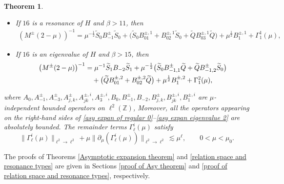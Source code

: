 \documentclass[reqno, 11pt]{amsart}
\newtheorem{theorem}[definition]{Theorem}
\newcommand\Z{\mathbb{Z}}
\numberwithin{equation}{section}
\begin{document}
\begin{theorem}
\begin{itemize}
\begin{align}\label{asy expan regular 2}
\left(M^{\pm}(2-\mu)\right)^{-1}=\widetilde{Q}B_{0}\widetilde{Q}+
\mu^{\frac{1}{2}}B^{\pm,0}_1 +\Gamma^{0}_{1}(\mu),
\end{align}
\item [{\rm(v)}] If $16$ is a resonance of $H$ and $\beta>11$, then
\begin{align}\label{asy expan resonance 2}
\left(M^{\pm}(2-\mu)\right)^{-1}=\mu^{-\frac{1}{2}}\widetilde{S}_0B^{\pm}_{-1}\widetilde{S}_0+\big(\widetilde{S}_0B^{\pm,1}_{01}+B^{\pm,1}_{02}\widetilde{S}_0+\widetilde{Q}B^{\pm,1}_{03}\widetilde{Q}\big)+
\mu^{\frac{1}{2}}B^{\pm,1}_1 +\Gamma^{1}_{1}(\mu),
\end{align}
\item [{\rm(vi)}] If $16$ is an eigenvalue of $H$ and $\beta>15$, then
\begin{align}\label{asy expan eigenvalue 2}
\left(M^{\pm}(2-\mu)\right)^{-1}&=\mu^{-1}\widetilde{S}_1B_{-2}\widetilde{S}_1+\mu^{-\frac{1}{2}}\big(\widetilde{S}_0B^{\pm}_{-1,1}\widetilde{Q}+\widetilde{Q}B^{\pm}_{-1,2}\widetilde{S}_0\big)\notag\\
&\quad +\big(\widetilde{Q}B^{\pm,2}_{01}+B^{\pm,2}_{02}\widetilde{Q}\big)+
\mu^{\frac{1}{2}}B^{\pm,2}_1 +\Gamma^{2}_{1}(\mu),
\end{align}
\end{itemize}
where
$A_{0},A^{\pm}_{-1},A^{\pm}_{-3},A^{\pm}_{j,k},A^{\pm,i}_{jk},A^{\pm,i}_3,B_{0},B^{\pm}_{-1},B_{-2},B^{\pm}_{j,k},B^{\pm,i}_{jk},B^{\pm,i}_{1}$ are $\mu$-independent bounded operators on $\ell^2(\Z)$, Moreover, all the operators appearing on the right-hand
sides of \eqref{asy expan of regular 0}--\eqref{asy expan eigenvalue 2}
are absolutely bounded. The remainder terms $\Gamma^{i}_\ell(\mu)$ satisfy 
\begin{equation}\label{estimate of Gamma}
\|\Gamma^{i}_{\ell}(\mu)\|_{\ell^2\rightarrow\ell^2}+\mu\big\|\partial_{\mu}(\Gamma^{i}_{\ell}(\mu))\big\|_{\ell^2\rightarrow\ell^2}\lesssim\mu^{\ell},\qquad 0<\mu<\mu_0.
\end{equation}
\end{theorem}
The proofs of Theorems \ref{Asymptotic expansion theorem} and \ref{relation space and resonance types} are given in Sections \ref{proof of Asy theorem} and \ref{proof of relation space and resonance types}, respectively.
\end{document}
